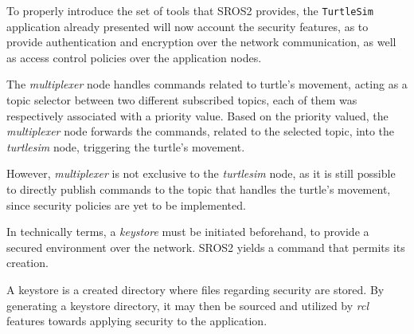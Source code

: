 To properly introduce the set of tools that SROS2 provides, the \texttt{TurtleSim} application already presented will now account the security features, as to provide authentication and encryption over the network communication, as well as access control policies over the application nodes. 
            
The \textit{multiplexer} node handles commands related to turtle's movement, acting as a topic selector between two different subscribed topics, each of them was respectively associated with a priority value. Based on the priority valued, the \textit{multiplexer} node forwards the commands, related to the selected topic, into the \textit{turtlesim} node, triggering the turtle's movement. 

However, \textit{multiplexer} is not exclusive to the \textit{turtlesim} node, as it is still possible to directly publish commands to the topic that handles the turtle's movement, since security policies are yet to be implemented.




In technically terms, a \textit{keystore} must be initiated beforehand, to provide a secured environment over the network. SROS2 yields a command that permits its creation. 

A keystore is a created directory where files regarding security are stored. By generating a keystore directory, it may then be sourced and utilized by \textit{rcl} features towards applying security to the application.
            
